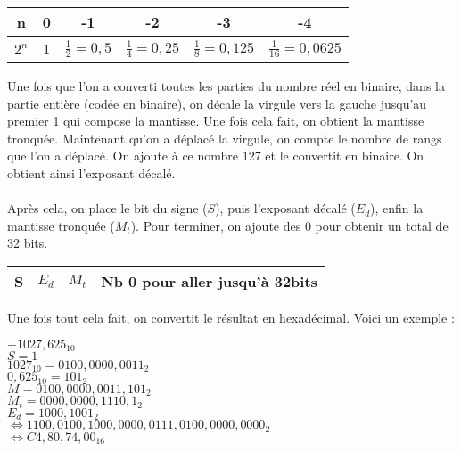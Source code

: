 \documentclass{article}
\begin{document}
		\begin{center}
			\begin{tabular}{ | c | c | c | c | c | c | }
  				\hline
  					n & 0 & -1 & -2 & -3 & -4 \\
  				\hline
  					$2^n$ & 1 & $\frac{1}{2} = 0,5$ & $\frac{1}{4} = 0,25$ & $\frac{1}{8} = 0,125$ & $\frac{1}{16} = 0,0625$ \\
	  			\hline
			\end{tabular}
		\end{center}
	
		Une fois que l'on a converti toutes les parties du nombre réel en binaire, dans la partie entière (codée en binaire), on décale la virgule vers la gauche jusqu'au premier 1 qui compose la mantisse. Une fois cela fait, on obtient la mantisse tronquée. Maintenant qu'on a déplacé la virgule, on compte le nombre de rangs que l'on a déplacé. On ajoute à ce nombre 127 et le convertit en binaire. On obtient ainsi l'exposant décalé. 
		\\ \\
Après cela, on place le bit du signe ($S$), puis l'exposant décalé ($E_d$), enfin la mantisse tronquée ($M_t$). Pour terminer, on ajoute des 0 pour obtenir un total de 32 bits.		
		
		\begin{center}
			\begin{tabular}{ | l | c | c | c | }
				\hline
					S & $E_d$ & $M_t$ & Nb 0 pour aller jusqu'à 32bits \\
				\hline
			\end{tabular}
		\end{center}			
		
Une fois tout cela fait, on convertit le résultat en hexadécimal. Voici un exemple :		
		
		\begin{center}
			$-1027,625_{10}$ \\
			$S = 1$ \\
			$1027_{10} = 0100,0000,0011_2$ \\
			$0,625_{10} = 101_2$ \\
			$M = 0100,0000,0011,101_2$ \\
			$M_t = 0000,0000,1110,1_2$ \\
			$E_d = 1000,1001_2$ \\
			$\iff 1100,0100,1000,0000,0111,0100,0000,0000_2$ \\
			$\iff C4,80,74,00_{16}$
		\end{center} 
				
\end{document}
